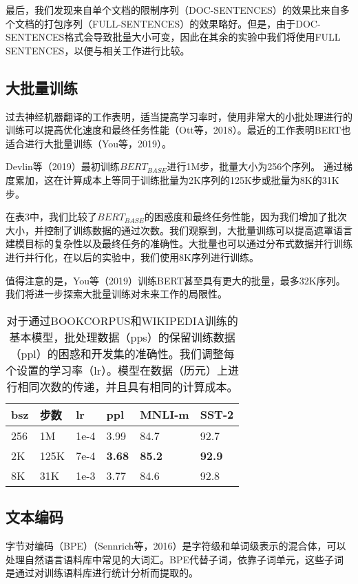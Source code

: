 \documentclass[lang=cn,11pt,a4paper,twocolumn]{elegantpaper}
\begin{document}
最后，我们发现来自单个文档的限制序列（DOC-SENTENCES）的效果比来自多个文档的打包序列（FULL-SENTENCES）的效果略好。但是，由于DOC-SENTENCES格式会导致批量大小可变，因此在其余的实验中我们将使用FULL SENTENCES，以便与相关工作进行比较。

\subsection{大批量训练}
过去神经机器翻译的工作表明，适当提高学习率时，使用非常大的小批处理进行的训练可以提高优化速度和最终任务性能（Ott等，2018）。最近的工作表明BERT也适合进行大批量训练（You等，2019）。

Devlin等（2019）最初训练$BERT_{BASE}$进行1M步，批量大小为256个序列。
通过梯度累加，这在计算成本上等同于训练批量为2K序列的125K步或批量为8K的31K步。

在表3中，我们比较了$BERT_{BASE}$的困惑度和最终任务性能，因为我们增加了批次大小，并控制了训练数据的通过次数。我们观察到，大批量训练可以提高遮罩语言建模目标的复杂性以及最终任务的准确性。大批量也可以通过分布式数据并行训练进行并行化，在以后的实验中，我们使用8K序列进行训练。

值得注意的是，You等（2019）训练BERT甚至具有更大的批量，最多32K序列。我们将进一步探索大批量训练对未来工作的局限性。

\begin{table}[]
  \centering
  \begin{tabular}{llllll}
  \hline
  \textbf{bsz} & 步数   & \textbf{lr} & \textbf{ppl}  & \textbf{MNLI-m} & \textbf{SST-2} \\ \hline
  256          & 1M   & 1e-4        & 3.99          & 84.7            & 92.7           \\
  2K           & 125K & 7e-4        & \textbf{3.68} & \textbf{85.2}   & \textbf{92.9}  \\
  8K           & 31K  & 1e-3        & 3.77          & 84.6            & 92.8           \\ \hline
  \end{tabular}
  \caption{对于通过BOOKCORPUS和WIKIPEDIA训练的基本模型，批处理数据（pps）的保留训练数据（ppl）的困惑和开发集的准确性。我们调整每个设置的学习率（lr）。模型在数据（历元）上进行相同次数的传递，并且具有相同的计算成本。}
  \end{table}

\subsection{文本编码}
字节对编码（BPE）（Sennrich等，2016）是字符级和单词级表示的混合体，可以处理自然语言语料库中常见的大词汇。BPE代替子词，依靠子词单元，这些子词是通过对训练语料库进行统计分析而提取的。
\end{document}

